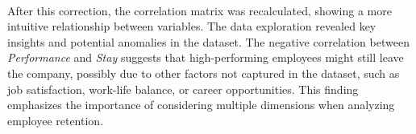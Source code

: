 \documentclass{article}
\begin{document}
\\
After this correction, the correlation matrix was recalculated, showing a more intuitive relationship between variables. The data exploration revealed key insights and potential anomalies in the dataset. The negative correlation between \textit{Performance} and \textit{Stay} suggests that high-performing employees might still leave the company, possibly due to other factors not captured in the dataset, such as job satisfaction, work-life balance, or career opportunities. This finding emphasizes the importance of considering multiple dimensions when analyzing employee retention.
\end{document}
